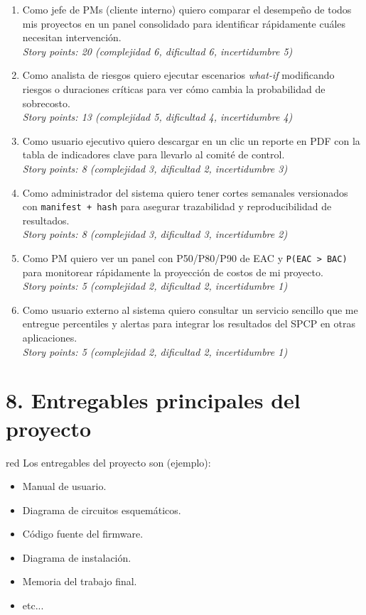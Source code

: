 \documentclass[12pt]
{charter}
\begin{document}
\begin{enumerate}
  \item Como jefe de PMs (cliente interno) quiero comparar el desempeño de todos mis proyectos en un panel consolidado para identificar rápidamente cuáles necesitan intervención.\\
  \textit{Story points: 20 (complejidad 6, dificultad 6, incertidumbre 5)}

  \item Como analista de riesgos quiero ejecutar escenarios \textit{what-if} modificando riesgos o duraciones críticas para ver cómo cambia la probabilidad de sobrecosto.\\
  \textit{Story points: 13 (complejidad 5, dificultad 4, incertidumbre 4)}

  \item Como usuario ejecutivo quiero descargar en un clic un reporte en PDF con la tabla de indicadores clave para llevarlo al comité de control.\\
  \textit{Story points: 8 (complejidad 3, dificultad 2, incertidumbre 3)}

  \item Como administrador del sistema quiero tener cortes semanales versionados con 
  \texttt{manifest + hash} para asegurar trazabilidad y reproducibilidad de resultados.\\
  \textit{Story points: 8 (complejidad 3, dificultad 3, incertidumbre 2)}

  \item Como PM quiero ver un panel con P50/P80/P90 de EAC y \texttt{P(EAC > BAC)} 
  para monitorear rápidamente la proyección de costos de mi proyecto.\\
  \textit{Story points: 5 (complejidad 2, dificultad 2, incertidumbre 1)}

  \item Como usuario externo al sistema quiero consultar un servicio sencillo que me entregue percentiles y alertas para integrar los resultados del SPCP en otras aplicaciones.\\
  \textit{Story points: 5 (complejidad 2, dificultad 2, incertidumbre 1)}
\end{enumerate}

\section{8. Entregables principales del proyecto}
\label{sec:entregables}

\begin{consigna}{red}
Los entregables del proyecto son (ejemplo):

\begin{itemize}
	\item Manual de usuario.
	\item Diagrama de circuitos esquemáticos.
	\item Código fuente del firmware.
	\item Diagrama de instalación.
	\item Memoria del trabajo final.
	\item etc...
\end{itemize}
\end{consigna}
\end{document}
